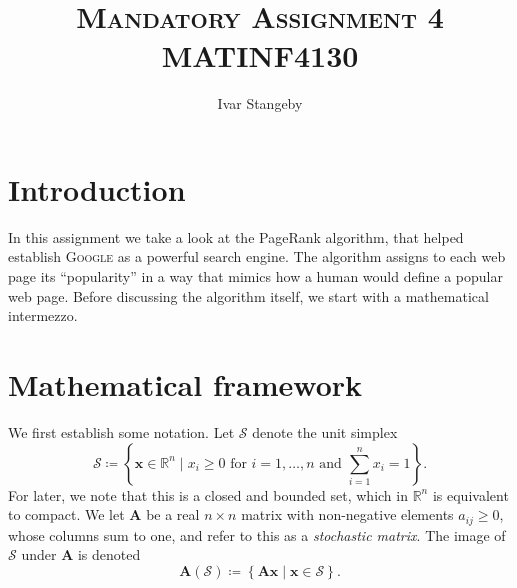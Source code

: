 \documentclass[12pt, oneside, article, a4paper]{memoir}
\title{ \textsc{Mandatory Assignment 4} \\
\textsc{MATINF4130}}
\author{Ivar Stangeby}
\newcommand{\mat}[1]{\bm{#1}}
\begin{document}
\maketitle

\chapter{Introduction}

In this assignment we take a look at the PageRank algorithm, that helped
establish \textsc{Google} as a powerful search engine.  The algorithm
assigns to each web page its ``popularity'' in a way that mimics how a
human would define a popular web page. Before discussing the algorithm
itself, we start with a mathematical intermezzo.

\chapter{Mathematical framework}

We first establish some notation. Let \( \mathcal{S} \) denote the unit
simplex 
\begin{equation}
    \mathcal{S} \coloneqq \left\{ \mat{x} \in \mathbb{R}^n \mid x_i \geq
    0 \text{ for  } i = 1, \ldots, n \text{ and } \sum_{i=1}^n x_i =
1\right\}.
\end{equation}
For later, we note that this is a closed and bounded set, which in \(
\mathbb{R}^n\) is equivalent to compact. We let \( \mat{A} \) be a real
\( n \times n \) matrix with non-negative elements \( a_{ij} \geq 0 \),
whose columns sum to one, and refer to this as a \emph{stochastic
matrix}.  The image of \( \mathcal{S} \) under \( \mat{A} \) is denoted
\begin{equation}
    \mat{A}(\mathcal{S}) \coloneqq  \left\{ \mat{Ax} \mid \mat{x} \in
    \mathcal{S} \right\}.
\end{equation}
\end{document}

